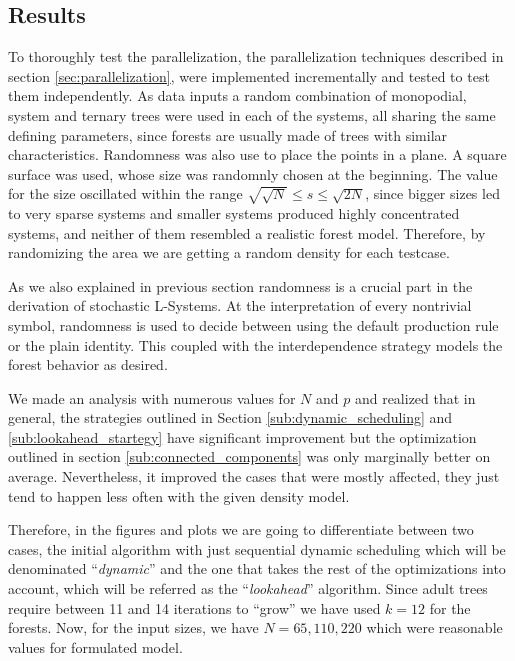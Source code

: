 \documentclass[letterpaper,twoside,11pt]{article}
\begin{document}
\begin{multicols}{2}


\section{Results} %
\label{sec:results}

To thoroughly test the parallelization, the parallelization techniques described in section \ref{sec:parallelization}, were implemented incrementally and tested to test them independently. As data inputs a random combination of monopodial, system and ternary trees were used in each of the systems, all sharing the same defining parameters, since forests are usually made of trees with similar characteristics. Randomness was also use to place the points in a plane. A square surface was used, whose size was randomnly chosen at the beginning. The value for the size oscillated within the range $\sqrt{\sqrt{N}} \leq s \leq \sqrt{2N}$, since bigger sizes led to very sparse systems and smaller systems produced highly concentrated systems,  and neither of them resembled a realistic forest model. Therefore, by randomizing the area we are getting a random density for each testcase.

As we also explained in previous section randomness is a crucial part in the derivation of stochastic L-Systems. At the interpretation of every nontrivial symbol, randomness is used to decide between using the default production rule or the plain identity. This coupled with the interdependence strategy models the forest behavior as desired.

We made an analysis with numerous values for $N$ and $p$ and realized that in general, the strategies outlined in Section \ref{sub:dynamic_scheduling} and \ref{sub:lookahead_startegy} have significant improvement but the optimization outlined in section \ref{sub:connected_components} was only marginally better on average. Nevertheless, it improved the cases that were mostly affected, they just tend to happen less often with the given density model.

Therefore, in the figures and plots we are going to differentiate between two cases, the initial algorithm with just sequential dynamic scheduling which will be denominated ``\emph{dynamic}'' and the one that takes the rest of the optimizations into account, which will be referred as the ``\emph{lookahead}'' algorithm. Since adult trees require between 11 and 14 iterations to ``grow'' we have used $k = 12$ for the forests. Now, for the input sizes, we have $N = 65, 110, 220$ which were reasonable values for formulated model.


\end{multicols}
\end{document}
